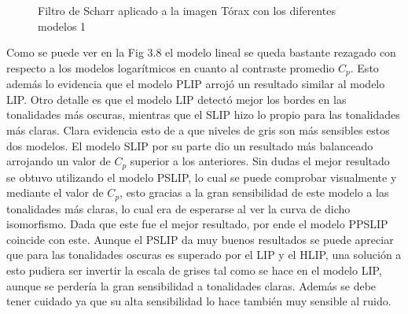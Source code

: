 \begin{figure}
\begin{center}
		\caption{Filtro de Scharr aplicado a la imagen T\'orax con los diferentes modelos 1}
	\end{center}
\end{figure} 

Como se puede ver en la Fig 3.8 el modelo lineal se queda bastante rezagado con respecto a los modelos logar\'itmicos en cuanto al contraste promedio $C_p$. Esto adem\'as lo evidencia que el modelo PLIP arroj\'o un resultado similar al modelo LIP. Otro detalle es que el modelo LIP detect\'o mejor los bordes en las tonalidades m\'as oscuras, mientras que el SLIP hizo lo propio para las tonalidades m\'as claras. Clara evidencia esto de a que niveles de gris son m\'as sensibles estos dos modelos. El modelo SLIP por su parte dio un resultado m\'as balanceado arrojando un valor de $C_p$ superior a los anteriores. Sin dudas el mejor resultado se obtuvo utilizando el modelo PSLIP, lo cual se puede comprobar visualmente y mediante el valor de $C_p$, esto gracias a la gran sensibilidad de este modelo a las tonalidades m\'as claras, lo cual era de esperarse al ver la curva de dicho isomorfismo. Dada que este fue el mejor resultado, por ende el modelo PPSLIP coincide con este. Aunque el PSLIP da muy buenos resultados se puede apreciar que para las tonalidades oscuras es superado por el LIP y el HLIP, una soluci\'on a esto pudiera ser invertir la escala de grises tal como se hace en el modelo LIP, aunque se perder\'ia la gran sensibilidad a tonalidades claras. Adem\'as se debe tener cuidado ya que su alta sensibilidad lo hace tambi\'en muy sensible al ruido.


